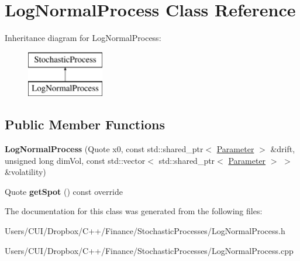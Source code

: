 \hypertarget{class_log_normal_process}{}\section{Log\+Normal\+Process Class Reference}
\label{class_log_normal_process}
Inheritance diagram for Log\+Normal\+Process\+:\begin{figure}[H]
\begin{center}
\leavevmode
\includegraphics[height=2.000000cm]{class_log_normal_process}
\end{center}
\end{figure}
\subsection*{Public Member Functions}
\begin{DoxyCompactItemize}
\item 
\hypertarget{class_log_normal_process_ace234a1856730ea48978eaf3cb3f7a79}{}\label{class_log_normal_process_ace234a1856730ea48978eaf3cb3f7a79} 
{\bfseries Log\+Normal\+Process} (Quote x0, const std\+::shared\+\_\+ptr$<$ \hyperlink{class_parameter}{Parameter} $>$ \&drift, unsigned long dim\+Vol, const std\+::vector$<$ std\+::shared\+\_\+ptr$<$ \hyperlink{class_parameter}{Parameter} $>$ $>$ \&volatility)
\item 
\hypertarget{class_log_normal_process_a3732c44145aa35d1e2000cc0140bfb03}{}\label{class_log_normal_process_a3732c44145aa35d1e2000cc0140bfb03} 
Quote {\bfseries get\+Spot} () const override
\end{DoxyCompactItemize}


The documentation for this class was generated from the following files\+:\begin{DoxyCompactItemize}
\item 
Users/\+C\+U\+I/\+Dropbox/\+C++/\+Finance/\+Stochastic\+Processes/Log\+Normal\+Process.\+h\item 
Users/\+C\+U\+I/\+Dropbox/\+C++/\+Finance/\+Stochastic\+Processes/Log\+Normal\+Process.\+cpp\end{DoxyCompactItemize}
